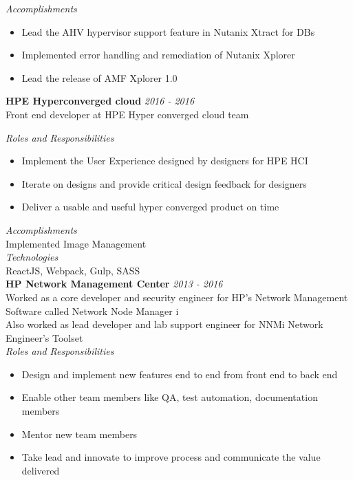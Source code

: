 \documentclass[line,margin]{res}
\begin{document}
\begin{resume}
{\it{Accomplishments}}\\
\begin{itemize}
\item Lead the AHV hypervisor support feature in Nutanix Xtract for DBs
\item Implemented error handling and remediation of Nutanix Xplorer
\item Lead the release of AMF Xplorer 1.0
\end{itemize}


{\bf HPE Hyperconverged cloud} \hfill {\it{2016 - 2016}}\\
Front end developer at HPE Hyper converged cloud team

{\it{Roles and Responsibilities}}\\
\begin{itemize}
\item Implement the User Experience designed by designers for HPE HCI
\item Iterate on designs and provide critical design feedback for designers
\item Deliver a usable and useful hyper converged product on time
\end{itemize}

{\it{Accomplishments}}\\
Implemented Image Management\\

{\it{Technologies}}\\
ReactJS, Webpack, Gulp, SASS\\


{\bf HP Network Management Center} \hfill {\it{2013 - 2016}}\\
Worked as a core developer and security engineer for HP's Network Management Software called Network Node Manager i\\
Also worked as lead developer and lab support engineer for NNMi Network Engineer's Toolset\\

{\it{Roles and Responsibilities}}\\
\begin{itemize}
\item Design and implement new features end to end from front end to back end
\item Enable other team members like QA, test automation, documentation members
\item Mentor new team members
\item Take lead and innovate to improve process and communicate the value delivered
\end{itemize}


\end{resume}
\end{document}
